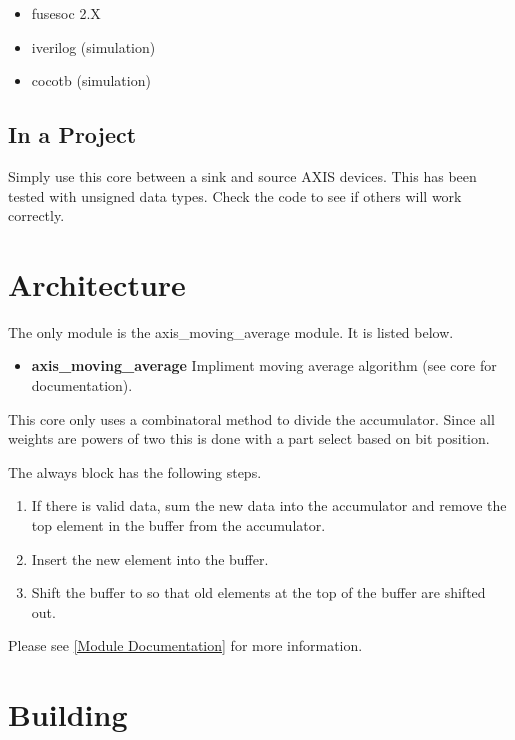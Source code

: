 \begin{itemize}
  \item fusesoc 2.X
  \item iverilog (simulation)
  \item cocotb (simulation)
\end{itemize}



\subsection{In a Project}
\par
Simply use this core between a sink and source AXIS devices. This has been tested with unsigned data types. Check the code to see if others will work correctly.

\section{Architecture}
\par
The only module is the axis\_moving\_average module. It is listed below.

\begin{itemize}
  \item \textbf{axis\_moving\_average} Impliment moving average algorithm (see core for documentation).
\end{itemize}

\par
This core only uses a combinatoral method to divide the accumulator. Since all weights are powers of two this is done with a part select based on bit position.

\par
The always block has the following steps.
\begin{enumerate}
\item If there is valid data, sum the new data into the accumulator and remove the top element in the buffer from the accumulator.
\item Insert the new element into the buffer.
\item Shift the buffer to so that old elements at the top of the buffer are shifted out.
\end{enumerate}

Please see \ref{Module Documentation} for more information.

\section{Building}

